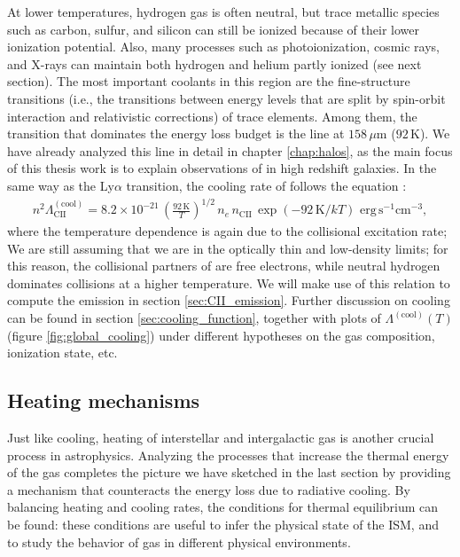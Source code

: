 At lower temperatures, hydrogen gas is often neutral, but trace metallic species such as carbon, sulfur, and silicon can still be ionized because of their lower ionization potential. Also, many processes such as photoionization, cosmic rays, and X-rays can maintain both hydrogen and helium partly ionized (see next section). The most important coolants in this region are the fine-structure transitions (i.e., the transitions between energy levels that are split by spin-orbit interaction and relativistic corrections) of trace elements. Among them, the transition that dominates the energy loss budget is the \CII line at $158\,\mu\mathrm{m}$ ($92\,\mathrm{K}$). We have already analyzed this line in detail in chapter \ref{chap:halos}, as the main focus of this thesis work is to explain observations of \CII in high redshift galaxies. In the same way as the Ly$\alpha$ transition, the cooling rate of \CII follows the equation \citep{dalgarno1972}:
\begin{align}
    n^2 \Lambda_\mathrm{CII}^{\mathrm{(cool)}} = 8.2\times10^{-21} \,\left(\frac{92\,\mathrm{K}}{T}\right)^{1/2}\,n_e \,n_\mathrm{CII} \,\exp(-92\,\mathrm{K}/kT)\,\,\mathrm{erg}\,\mathrm{s}^{-1}\mathrm{cm}^{-3}, \label{eq:CII_cooling}
\end{align}
where the temperature dependence is again due to the collisional excitation rate; We are still assuming that we are in the optically thin and low-density limits; for this reason, the collisional partners of \CII are free electrons, while neutral hydrogen dominates \CIIion collisions at a higher temperature. 
We will make use of this relation to compute the \CII emission in section \ref{sec:CII_emission}.
Further discussion on cooling can be found in section \ref{sec:cooling_function}, together with plots of $\Lambda^{\mathrm{(cool)}}(T)$ (figure \ref{fig:global_cooling}) under different hypotheses on the gas composition, ionization state, etc. 





\subsection{Heating mechanisms} \label{sec:heating}


Just like cooling, heating of interstellar and intergalactic gas is another crucial process in astrophysics. Analyzing the processes that increase the thermal energy of the gas completes the picture we have sketched in the last section by providing a mechanism that counteracts the energy loss due to radiative cooling. By balancing heating and cooling rates, the conditions for thermal equilibrium can be found: these conditions are useful to infer the physical state of the ISM, and to study the behavior of gas in different physical environments. 

